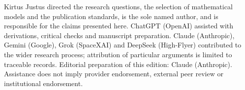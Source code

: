 \documentclass[11pt,a4paper]{article}
\begin{document}
{\small Kirtus Justus directed the research questions, the selection of mathematical models and the publication standards, is the sole named author, and is responsible for the claims presented here. ChatGPT (OpenAI) assisted with derivations, critical checks and manuscript preparation. Claude (Anthropic), Gemini (Google), Grok (SpaceXAI) and DeepSeek (High-Flyer) contributed to the wider research process; attribution of particular arguments is limited to traceable records. Editorial preparation of this edition: Claude (Anthropic). Assistance does not imply provider endorsement, external peer review or institutional endorsement.\par}
\end{document}
